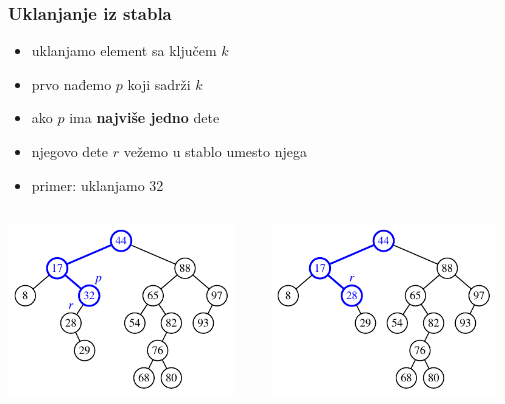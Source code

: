 \documentclass[compress]{beamer}
\begin{document}
\begin{frame}[fragile]
  \frametitle{Uklanjanje iz stabla}
  \begin{itemize}
    \item uklanjamo element sa ključem $k$
    \item prvo nađemo $p$ koji sadrži $k$
    \item ako $p$ ima \textbf{najviše jedno} dete
    \item njegovo dete $r$ vežemo u stablo umesto njega
    \item primer: uklanjamo 32
  \end{itemize}
  \begin{columns}
    \begin{column}[c]{6cm}
      \begin{center}
        \includegraphics[width=6cm]{asp-11-pic06a.pdf}
      \end{center}
    \end{column}  
    \begin{column}[c]{6cm}
      \begin{center}
        \includegraphics[width=6cm]{asp-11-pic06b.pdf}
      \end{center}
    \end{column}  
  \end{columns}
\end{frame}
\end{document}
